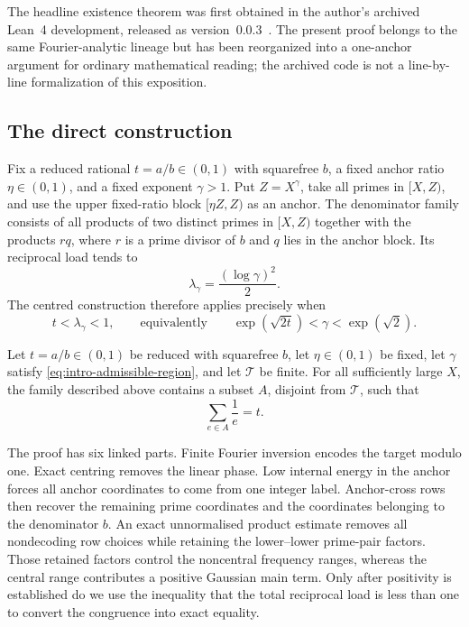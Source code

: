 The headline existence theorem was first obtained in the author's archived Lean~4 development, released as version~0.0.3~\cite{tang-erdos-306-formal}. The present proof belongs to the same Fourier-analytic lineage but has been reorganized into a one-anchor argument for ordinary mathematical reading; the archived code is not a line-by-line formalization of this exposition.

\subsection{The direct construction}

Fix a reduced rational $t=a/b\in(0,1)$ with squarefree $b$, a fixed anchor ratio $\eta\in(0,1)$, and a fixed exponent $\gamma>1$. Put $Z=X^\gamma$, take all primes in $[X,Z)$, and use the upper fixed-ratio block $[\eta Z,Z)$ as an anchor. The denominator family consists of all products of two distinct primes in $[X,Z)$ together with the products $rq$, where $r$ is a prime divisor of $b$ and $q$ lies in the anchor block. Its reciprocal load tends to
\[
 \lambda_\gamma=\frac{(\log\gamma)^2}{2}.
\]
The centred construction therefore applies precisely when
\begin{equation}
\label{eq:intro-admissible-region}
 t<\lambda_\gamma<1,
 \qquad\text{equivalently}\qquad
 \exp(\sqrt{2t})<\gamma<\exp(\sqrt2).
\end{equation}

\begin{theorem}
\label{thm:direct-intro}
Let $t=a/b\in(0,1)$ be reduced with squarefree $b$, let $\eta\in(0,1)$ be fixed, let $\gamma$ satisfy \cref{eq:intro-admissible-region}, and let $\mathcal T$ be finite. For all sufficiently large $X$, the family described above contains a subset $A$, disjoint from $\mathcal T$, such that
\[
 \sum_{e\in A}\frac1e=t.
\]
\end{theorem}

The proof has six linked parts. Finite Fourier inversion encodes the target modulo one. Exact centring removes the linear phase. Low internal energy in the anchor forces all anchor coordinates to come from one integer label. Anchor-cross rows then recover the remaining prime coordinates and the coordinates belonging to the denominator $b$. An exact unnormalised product estimate removes all nondecoding row choices while retaining the lower--lower prime-pair factors. Those retained factors control the noncentral frequency ranges, whereas the central range contributes a positive Gaussian main term. Only after positivity is established do we use the inequality that the total reciprocal load is less than one to convert the congruence into exact equality.

